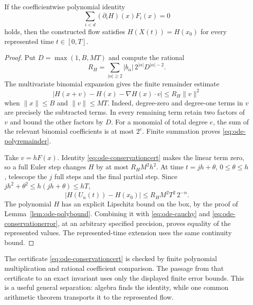 \begin{theorem}
\label{thm:ode-conservation}
If the coefficientwise polynomial identity
\begin{equation}
 \sum_{i<d}(\partial_iH)(x)F_i(x)=0
 \label{eq:ode-conservationcert}
\end{equation}
holds, then the constructed flow satisfies
$H(X(t))=H(x_0)$ for every represented time $t\in[0,T]$.
\end{theorem}
\begin{proof}
Put $D=\max(1,B,MT)$ and compute the rational
\[
 R_H=\sum_{|\alpha|\ge2}|b_\alpha|\,2^{|\alpha|}
                                  D^{|\alpha|-2}.
\]
The multivariate binomial expansion gives the finite remainder estimate
\begin{equation}
 |H(x+v)-H(x)-\nabla H(x)\cdot v|\le R_H\lVert v\rVert^2
 \label{eq:ode-polyremainder}
\end{equation}
when $\lVert x\rVert\le B$ and $\lVert v\rVert\le MT$.
Indeed, degree-zero and degree-one terms in $v$ are precisely the
subtracted terms.  In every remaining term retain two factors of $v$
and bound the other factors by $D$.  For a monomial of total degree $e$,
the sum of the relevant binomial coefficients is at most $2^e$.
Finite summation proves \eqref{eq:ode-polyremainder}.

Take $v=hF(x)$.  Identity \eqref{eq:ode-conservationcert} makes the
linear term zero, so a full Euler step changes $H$ by at most
$R_HM^2h^2$.  At time $t=jh+\theta$, $0\le\theta\le h$, telescope
the $j$ full steps and the final partial step.  Since
$jh^2+\theta^2\le h(jh+\theta)\le hT$,
\begin{equation}
 |H(U_n(t))-H(x_0)|\le R_HM^2T^2\,2^{-n}.
 \label{eq:ode-conservationerror}
\end{equation}
The polynomial $H$ has an explicit Lipschitz bound on the box, by the
proof of Lemma~\ref{lem:ode-polybound}.  Combining it with
\eqref{eq:ode-cauchy} and \eqref{eq:ode-conservationerror}, at an
arbitrary specified precision, proves equality of the represented values.
The represented-time extension uses the same continuity bound.
\end{proof}

The certificate \eqref{eq:ode-conservationcert} is checked by finite
polynomial multiplication and rational coefficient comparison.  The
passage from that certificate to an exact invariant uses only the
displayed finite error bounds.  This is a useful general separation:
algebra finds the identity, while one common arithmetic theorem transports
it to the represented flow.

